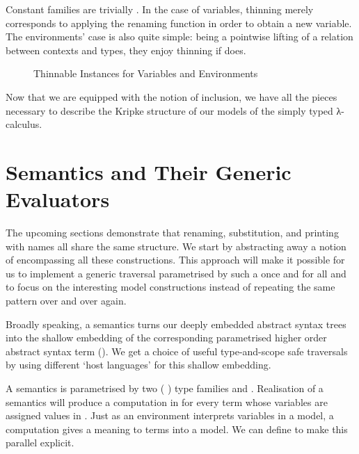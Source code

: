 Constant families are trivially . In the case of variables,
thinning merely corresponds to applying the renaming function in order to
obtain a new variable. The environments' case is also quite simple: being
a pointwise lifting of a relation  between contexts and types, they
enjoy thinning if  does.

\begin{figure}[h]
\begin{minipage}{0.5\textwidth}
\end{minipage}\begin{minipage}{0.5\textwidth}
\end{minipage}

\caption{Thinnable Instances for Variables and Environments\label{fig:thinVarEnv}}
\end{figure}

Now that we are equipped with the notion of inclusion, we have all
the pieces necessary to describe the Kripke structure of our models
of the simply typed λ-calculus.

\section{Semantics and Their Generic Evaluators}
\label{section:generic-semantics}

The upcoming sections demonstrate that renaming, substitution, and printing
with names all share the same structure. We start by abstracting away a notion
of  encompassing all these constructions. This approach will
make it possible for us to implement a generic traversal parametrised by
such a  once and for all and to focus on the interesting
model constructions instead of repeating the same pattern over and over
again.

Broadly speaking, a semantics turns our deeply embedded abstract syntax
trees into the shallow embedding of the corresponding parametrised higher
order abstract syntax term (\cite{chlipala2008parametric}). We get a
choice of useful type-and-scope safe traversals by using different `host
languages' for this shallow embedding.

A semantics is parametrised by two ( ) type families
 and . Realisation of a semantics will produce a computation
in  for every term whose variables are assigned values in .
Just as an environment interprets variables in a model, a computation
gives a meaning to terms into a model. We can define  to make
this parallel explicit.

